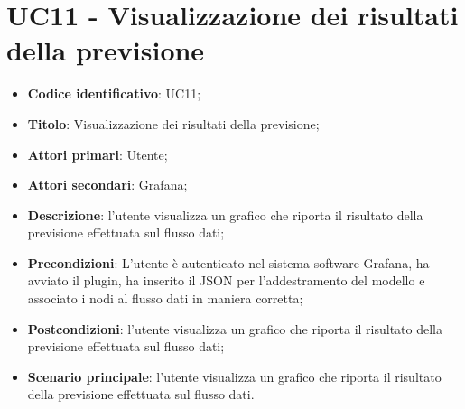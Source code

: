 \section{UC11 - Visualizzazione dei risultati della previsione}
\begin{itemize}
    \item \textbf{Codice identificativo}: UC11;
    \item \textbf{Titolo}: Visualizzazione dei risultati della previsione;
    \item \textbf{Attori primari}: Utente;
    \item \textbf{Attori secondari}: Grafana\glo;
    \item \textbf{Descrizione}: l'utente visualizza un grafico che riporta il risultato della previsione effettuata sul flusso dati;
    \item \textbf{Precondizioni}: L'utente è autenticato nel sistema software Grafana\glosp, ha avviato il plugin, ha inserito il JSON per l'addestramento del modello e associato i nodi al flusso dati in maniera corretta;
    \item \textbf{Postcondizioni}: l'utente visualizza un grafico che riporta il risultato della previsione effettuata sul flusso dati;
    \item \textbf{Scenario principale}: l'utente visualizza un grafico che riporta il risultato della previsione effettuata sul flusso dati.
\end{itemize}